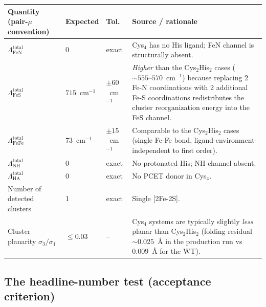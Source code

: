 \documentclass[10pt,a4paper,twoside]{article}
\begin{document}
\begin{longtable}{p{} p{} p{} p{}}
\toprule
\textbf{Quantity (pair-$\mu$ convention)} & \textbf{Expected} & \textbf{Tol.} & \textbf{Source / rationale} \\
\midrule
$\Lambda_\text{FeN}^\text{total}$
                          & 0                & exact
                          & Cys$_4$ has no His ligand; FeN channel
                            is structurally absent. \\
$\Lambda_\text{FeS}^\text{total}$
                          & $715$~cm$^{-1}$  & $\pm 60$~cm$^{-1}$
                          & \emph{Higher} than the Cys$_2$His$_2$
                            cases ($\sim 555\text{--}570$~cm$^{-1}$)
                            because replacing 2 Fe-N coordinations
                            with 2 additional Fe-S coordinations
                            redistributes the cluster reorganization
                            energy into the FeS channel. \\
$\Lambda_\text{FeFe}^\text{total}$
                          & $73$~cm$^{-1}$   & $\pm 15$~cm$^{-1}$
                          & Comparable to the Cys$_2$His$_2$ cases
                            (single Fe-Fe bond, ligand-environment-
                            independent to first order). \\
$\Lambda_\text{NH}^\text{total}$
                          & 0                & exact
                          & No protonated His; NH channel absent. \\
$\Lambda_\text{HA}^\text{total}$
                          & 0                & exact
                          & No PCET donor in Cys$_4$. \\
Number of detected clusters
                          & 1                & exact
                          & Single [2Fe-2S]. \\
Cluster planarity $\sigma_3/\sigma_1$
                          & $\leq 0.03$      & --
                          & Cys$_4$ systems are typically slightly
                            \emph{less} planar than Cys$_2$His$_2$
                            (folding residual $\sim 0.025$~\AA{}
                            in the production run vs $0.009$~\AA{}
                            for the WT). \\
\bottomrule
\end{longtable}

\subsection{The headline-number test (acceptance criterion)}
\end{document}
